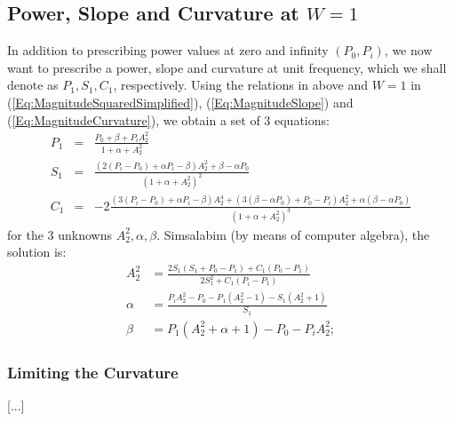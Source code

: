 \subsection{Power, Slope and Curvature at $W=1$}
In addition to prescribing power values at zero and infinity $(P_0, P_i)$, we now want to prescribe a power, slope and curvature at unit frequency, which we shall denote as $P_1, S_1, C_1$, respectively. Using the relations in above and $W=1$ in (\ref{Eq:MagnitudeSquaredSimplified}), (\ref{Eq:MagnitudeSlope}) and (\ref{Eq:MagnitudeCurvature}), we obtain a set of 3 equations:
\begin{eqnarray}
 P_1 &=& \frac{P_0 + \beta + P_i A_2^2}{1 + \alpha + A_2^2}  \nonumber\\
 S_1 &=& \frac{(2 (P_i-P_0) + \alpha P_i - \beta) A_2^2 + \beta - \alpha P_0}
              {(1 + \alpha + A_2^2)^2}                       \nonumber\\
 C_1 &=& -2 \frac{(3 (P_i-P_0)+\alpha P_i-\beta) A_2^4 + (3 (\beta-\alpha P_0)+P_0-P_i) A_2^2 + \alpha (\beta-\alpha P_0)}
                 {(1 + \alpha + A_2^2)^3}
\end{eqnarray}
for the 3 unknowns $A_2^2, \alpha, \beta$.  Simsalabim (by means of computer algebra), the solution is:
\begin{equation}
\boxed
{
 \begin{aligned}
  A_2^2  &= \frac{2 S_1 (S_1+P_0-P_1)+C_1 (P_0-P_1)}{2 S_1^2+C_1 (P_i-P_1)} \\
  \alpha &= \frac{P_i A_2^2-P_0-P_1(A_2^2-1)-S_1 (A_2^2+1)}{S_1}            \\
  \beta  &= P_1 (A_2^2+\alpha+1)-P_0-P_i A_2^2;
 \end{aligned}
}
\end{equation}

\subsubsection{Limiting the Curvature}
[...]





